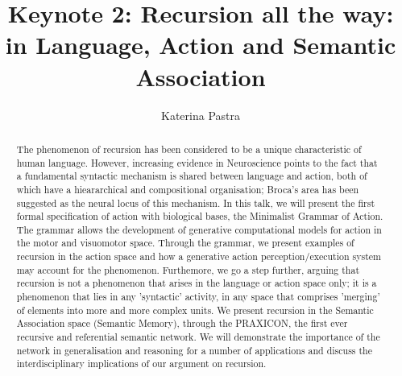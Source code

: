 \documentclass{article}
\title{Keynote 2: Recursion all the way: in Language, Action and Semantic Association}
\author{Katerina Pastra}
\date{}
\begin{document}
\maketitle
\thispagestyle{empty}
\begin{abstract}
The phenomenon of recursion has been considered to be a unique characteristic of human language. However, increasing evidence in Neuroscience points to the fact that a fundamental syntactic mechanism is shared between language and action, both of which have a hieararchical and compositional organisation; Broca's area has been suggested as the neural locus of this mechanism.  In this talk, we will present the first formal specification of action with biological bases, the Minimalist Grammar of Action. The grammar allows the development of  generative computational models for action in the motor and visuomotor space. Through the grammar, we present examples of recursion in the action space and how a generative action perception/execution system may account for the phenomenon. Furthemore, we go a step further, arguing that recursion is not a phenomenon that arises in the language or action space only; it is a phenomenon that lies in any 'syntactic' activity, in any space that comprises 'merging' of elements into more and more complex units. We present recursion in the Semantic Association space (Semantic Memory), through the PRAXICON, the first ever recursive and referential semantic network. We will demonstrate the importance of the network in generalisation and reasoning for a number of applications and discuss the interdisciplinary implications of our argument on recursion. 
\end{abstract}
\end{document}

